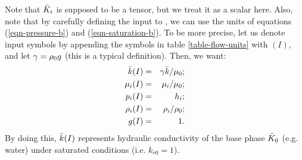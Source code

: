 Note that ${\bar K}_i$ is supposed to be a tensor, but we treat it as
a scalar here.
Also, note that by carefully defining the input to \parflow{}, we can
use the units of equations (\ref{eqn-pressure-b}) and
(\ref{eqn-saturation-b}).
To be more precise, let us denote \parflow{} input symbols by appending
the symbols in table \ref{table-flow-units} with $(I)$, and
let $\gamma = \rho_0 g$ (this is a typical definition).
Then, we want:
\begin{eqnarray} \label{eqn-parflow-input}
{\bar k} (I)    & = & \gamma {\bar k} / \mu_0 ; \\
\mu_i (I) & = & \mu_i / \mu_0 ; \\
p_i (I)   & = & h_i ; \\
\rho_i (I) & = & \rho_i / \rho_0 ; \\
g (I)      & = & 1 .
\end{eqnarray}
By doing this, ${\bar k} (I)$ represents hydraulic conductivity of the base
phase ${\bar K}_0$ (e.g. water) under saturated conditions (i.e. $k_{r0} = 1$).


